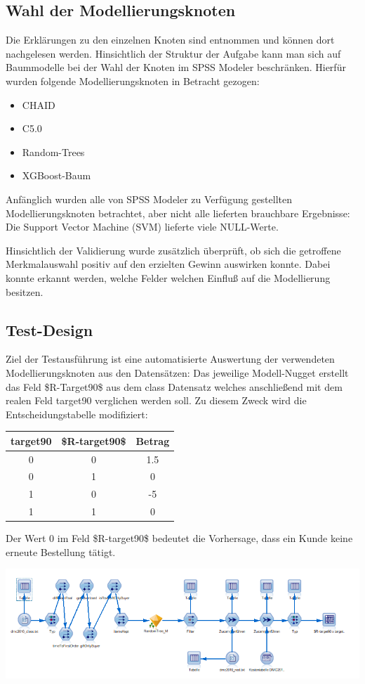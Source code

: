 \documentclass[a4paper,12pt]{article}
\begin{document}
\subsection{Wahl der Modellierungsknoten}
Die Erklärungen zu den einzelnen Knoten sind \cite{nodes} entnommen und können dort nachgelesen werden. 
Hinsichtlich der Struktur der Aufgabe kann man sich auf Baummodelle bei der Wahl der Knoten im SPSS Modeler beschränken. Hierfür wurden folgende Modellierungsknoten in Betracht gezogen:
\begin{itemize}
\item CHAID
\item C5.0
	\item Random-Trees
	\item XGBoost-Baum
\end{itemize} 

Anfänglich  wurden alle von SPSS Modeler zu Verfügung gestellten Modellierungsknoten betrachtet, aber nicht alle lieferten brauchbare
Ergebnisse: Die Support Vector Machine (SVM) lieferte viele NULL-Werte.
\par
Hinsichtlich der Validierung wurde zusätzlich überprüft, ob sich die getroffene Merkmalauswahl positiv auf den erzielten Gewinn auswirken konnte. Dabei konnte erkannt werden, welche Felder welchen Einfluß auf die Modellierung besitzen.
\subsection{Test-Design}
Ziel der Testausführung ist eine automatisierte Auswertung der verwendeten Modellierungsknoten aus den Datensätzen:
Das jeweilige Modell-Nugget erstellt das Feld \$R-Target90\$ aus dem class Datensatz welches anschließend mit dem realen Feld target90 verglichen werden soll.
Zu diesem Zweck wird die Entscheidungstabelle modifiziert:
\begin{center}
\begin{tabular}{c | c | c}
target90 & \$R-target90\$ & Betrag
\\
\hline
0 & 0 & 1.5
\\
\hline
0 & 1 & 0
\\
\hline
1 & 0 & -5
\\
\hline
1 & 1  & 0
\end{tabular}
\end{center}
Der Wert 0 im Feld \$R-target90\$ bedeutet die Vorhersage, dass ein Kunde keine erneute Bestellung tätigt.
\begin{center}
\includegraphics[width=\textwidth]{Screens/test_bewertung}
\end{center}
\end{document}
